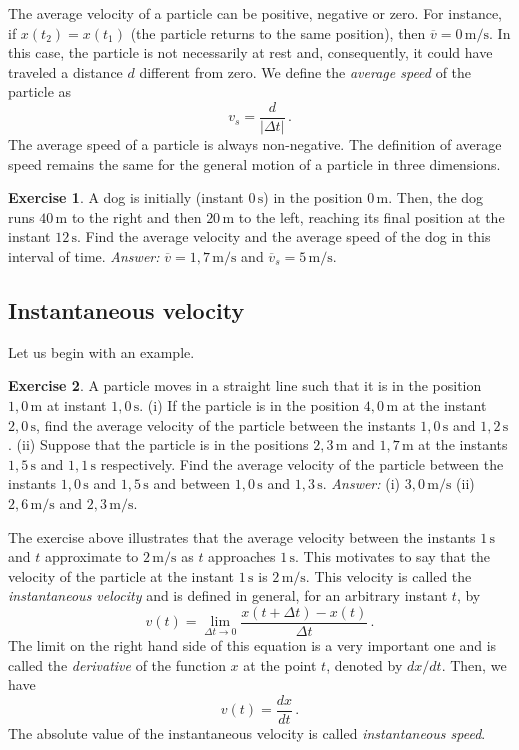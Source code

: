 \documentclass[12pt,a4paper]{article}
\theoremstyle{definition}
\newtheorem{ex}{Exercise}[section]
\begin{document}
The average velocity of a particle can be positive, negative or
zero. For instance, if $x(t_2)=x(t_1)$ (the particle returns to the
same position), then $\overline{v}=0\,\mathrm{m/s}$. In this case, the
particle is not necessarily at rest and, consequently, it could have
traveled a distance $d$ different from zero. We define the
\emph{average speed} of the particle as
$$v_s=\frac{d}{|\Delta t|}\,.$$
The average speed of a particle is always non-negative. The definition
of average speed remains the same for the general motion of a particle
in three dimensions.
\begin{ex}
  A dog is initially (instant $0\,\mathrm{s}$) in the position
  $0\,\mathrm{m}$. Then, the dog runs $40\,\mathrm{m}$ to the right
  and then $20\,\mathrm{m}$ to the left, reaching its final position
  at the instant $12\,\mathrm{s}$. Find the average velocity and the
  average speed of the dog in this interval of time. \emph{Answer:}
  $\overline{v}=1{,}7\,\mathrm{m/s}$ and
  $\overline{v}_s=5\,\mathrm{m/s}$.
\end{ex}

\subsection{Instantaneous velocity}

Let us begin with an example.

\begin{ex}
  A particle moves in a straight line such that it is in the position
  $1{,}0\,\mathrm{m}$ at instant $1{,}0\,\mathrm{s}$. (i) If the
  particle is in the position $4{,}0\,\mathrm{m}$ at the instant
  $2{,}0\,\mathrm{s}$, find the average velocity of the particle
  between the instants $1{,}0\,\mathrm{s}$ and
  $1{,}2\,\mathrm{s}$. (ii) Suppose that the particle is in the
  positions $2{,}3\,\mathrm{m}$ and $1{,}7\,\mathrm{m}$ at the
  instants $1{,}5\,\mathrm{s}$ and $1{,}1\,\mathrm{s}$
  respectively. Find the average velocity of the particle between the
  instants $1{,}0\,\mathrm{s}$ and $1{,}5\,\mathrm{s}$ and between
  $1{,}0\,\mathrm{s}$ and $1{,}3\,\mathrm{s}$. \emph{Answer:} (i)
  $3{,}0\,\mathrm{m/s}$ (ii) $2{,}6\,\mathrm{m/s}$ and
  $2{,}3\,\mathrm{m/s}$.
\end{ex}

The exercise above illustrates that the average velocity between the
instants $1\,\mathrm{s}$ and $t$ approximate to $2\,\mathrm{m/s}$ as
$t$ approaches $1\,\mathrm{s}$. This motivates to say that the
velocity of the particle at the instant $1\,\mathrm{s}$ is
$2\,\mathrm{m/s}$. This velocity is called the \emph{instantaneous
  velocity} and is defined in general, for an arbitrary instant $t$,
by
$$v(t)=\lim_{\Delta t\to 0}\frac{x(t+\Delta t)-x(t)}{\Delta t}\,.$$
The limit on the right hand side of this equation is a very important
one and is called the \emph{derivative} of the function $x$ at the
point $t$, denoted by $dx/dt$. Then, we have
$$v(t)=\frac{dx}{dt}\,.$$
The absolute value of the instantaneous velocity is called
\emph{instantaneous speed}.
\end{document}
